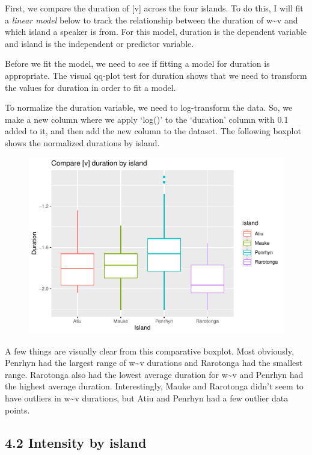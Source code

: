 \documentclass[
  ,man,floatsintext]{apa6}
\begin{document}
First, we compare the duration of {[}v{]} across the four islands. To do this, I will fit a \emph{linear model} below to track the relationship between the duration of w\textasciitilde v and which island a speaker is from. For this model, duration is the dependent variable and island is the independent or predictor variable.

Before we fit the model, we need to see if fitting a model for duration is appropriate. The visual qq-plot test for duration shows that we need to transform the values for duration in order to fit a model.

To normalize the duration variable, we need to log-transform the data. So, we make a new column where we apply `log()' to the `duration' column with 0.1 added to it, and then add the new column to the dataset. The following boxplot shows the normalized durations by island.

\begin{figure}
\includegraphics[width=0.75\linewidth]{D1cim_w_v_manuscript_files/figure-latex/print-mod1-1} \caption{ }\label{fig:print-mod1}
\end{figure}

A few things are visually clear from this comparative boxplot. Most obviously, Penrhyn had the largest range of w\textasciitilde v durations and Rarotonga had the smallest range. Rarotonga also had the lowest average duration for w\textasciitilde v and Penrhyn had the highest average duration. Interestingly, Mauke and Rarotonga didn't seem to have outliers in w\textasciitilde v durations, but Atiu and Penrhyn had a few outlier data points.

\subsection{4.2 Intensity by island}\label{intensity-by-island}
\end{document}
